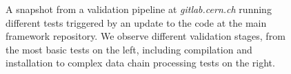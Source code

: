 
\begin{figure}[h]
  \centering
	\caption{A snapshot from a validation pipeline at \emph{gitlab.cern.ch} running different tests triggered by an update to the code at the main framework repository. We observe different validation stages, from the most basic tests on the left, including compilation and installation to complex data chain processing tests on the right.}\label{fig:pipelines}
\end{figure}
